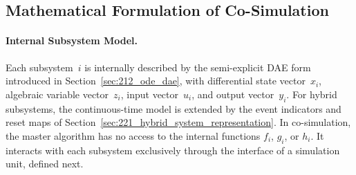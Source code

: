 \subsection{Mathematical Formulation of Co-Simulation}
\label{sec:232_cosim_formulation}

\paragraph{Internal Subsystem Model.}
Each subsystem~$i$ is internally described by the semi-explicit \ac{DAE} form introduced in Section~\ref{sec:212_ode_dae}, with differential state vector~$x_i$, algebraic variable vector~$z_i$, input vector~$u_i$, and output vector~$y_i$.
For hybrid subsystems, the continuous-time model is extended by the event indicators and reset maps of Section~\ref{sec:221_hybrid_system_representation}.
In co-simulation, the master algorithm has no access to the internal functions $f_i$, $g_i$, or $h_i$.
It interacts with each subsystem exclusively through the interface of a simulation unit, defined next.

